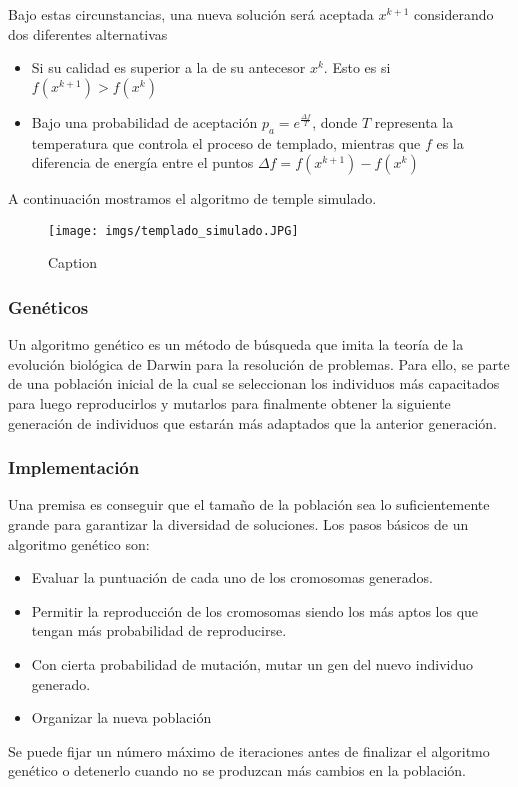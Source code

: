 \documentclass{article}
\begin{document}
Bajo estas circunstancias, una nueva soluci\'on ser\'a aceptada $x^{k+1}$ considerando dos diferentes alternativas
\begin{itemize}
    \item Si su calidad es superior a la de su antecesor $x^k$. Esto es si $f(x^{k+1})>f(x^k)$
    \item Bajo una probabilidad de aceptaci\'on $p_a = e^{\frac{\Delta f}{T}}$, donde $T$ representa la temperatura que controla el proceso de templado, mientras que $f$ es la diferencia de energ\'ia entre el puntos $\Delta f= f(x^{k+1})-f(x^k)$
\end{itemize}
A continuaci\'on mostramos el algoritmo de temple simulado.
\begin{figure}[h!]
    \centering
    \texttt{[image: imgs/templado\_simulado.JPG]}
    \caption{Caption}
    \label{fig:my_label}
\end{figure}
\subsubsection{Gen\'eticos}
Un algoritmo genético es un método de búsqueda que imita la
teoría de la evolución biológica de Darwin para la resolución de
problemas. Para ello, se parte de una población inicial de la cual
se seleccionan los individuos más capacitados para luego
reproducirlos y mutarlos para finalmente obtener la siguiente
generación de individuos que estarán más adaptados que la
anterior generación.
\subsubsection{Implementación}
Una premisa es conseguir que el tamaño de la población sea lo
suficientemente grande para garantizar la diversidad de
soluciones.
Los pasos básicos de un algoritmo genético son:
\begin{itemize}
\item Evaluar la puntuación de cada uno de los cromosomas
generados.
\item Permitir la reproducción de los cromosomas siendo los
más aptos los que tengan más probabilidad de
reproducirse.
\item Con cierta probabilidad de mutación, mutar un gen del
nuevo individuo generado.
\item Organizar la nueva población
\end{itemize}
Se puede fijar un número máximo de iteraciones
antes de finalizar el algoritmo genético o detenerlo cuando no se
produzcan más cambios en la población.
\end{document}
